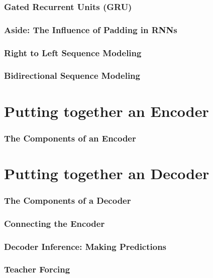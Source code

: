 \documentclass{beamer}
\begin{document}
\begin{frame}
\frametitle{Gated Recurrent Units (GRU)}

\end{frame}

\begin{frame}
\frametitle{Aside: The Influence of Padding in RNNs}

\end{frame}

\begin{frame}
\frametitle{Right to Left Sequence Modeling}

\end{frame}

\begin{frame}
\frametitle{Bidirectional Sequence Modeling}

\end{frame}

\section{Putting together an Encoder}

\begin{frame}
\frametitle{The Components of an Encoder}

\end{frame}


\section{Putting together an Decoder}

\begin{frame}
\frametitle{The Components of a Decoder}

\end{frame}

\begin{frame}
\frametitle{Connecting the Encoder}

\end{frame}

\begin{frame}
\frametitle{Decoder Inference: Making Predictions}

\end{frame}

\begin{frame}
\frametitle{Teacher Forcing}

\end{frame}
\end{document}

